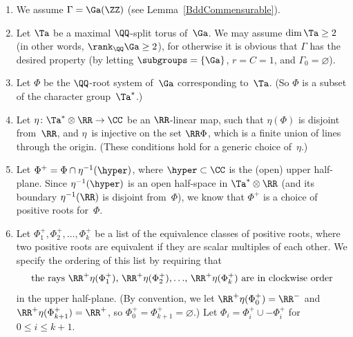\begin{notation} \label{QIBddGenNotation}\leavevmode
	\begin{enumerate}\itemsep=0pt
\item %
	We assume $\Gamma = \Ga(\ZZ)$ (see Lemma~\ref{BddCommensurable}).
\item %
	Let $\Ta$ be a maximal $\QQ$-split torus of~$\Ga$. We may assume $\dim \Ta \ge 2$ (in other words, $\rank_\QQ \Ga \ge 2$), for otherwise it is obvious that $\Gamma$ has the desired property (by letting $\subgroups = \{\Ga\}$, $r = C = 1$, and $\Gamma_0 = \varnothing$).
\item Let $\Phi$ be the $\QQ$-root system of~$\Ga$ corresponding to~$\Ta$.
	(So $\Phi$ is a subset of the character group~$\Ta^*$.)
\item Let $\eta \colon \Ta^* \otimes \RR \to \CC$ be an $\RR$-linear map, such that $\eta(\Phi)$ is disjoint from~$\RR$, and $\eta$~is injective on the set $\RR \Phi$, which is a finite union of lines through the origin. (These conditions hold for a generic choice of~$\eta$.)
\item Let $\Phi^+ = \Phi \cap \eta^{-1}(\hyper)$, where $\hyper \subset \CC$ is the (open) upper half-plane.
Since $\eta^{-1}(\hyper)$ is an open half-space in $\Ta^* \otimes \RR$ (and its boundary $\eta^{-1}(\RR)$ is disjoint from~$\Phi$), we know that $\Phi^+$ is a choice of positive roots for~$\Phi$.
\item Let $\Phi^+_1, \Phi^+_2,\ldots,\Phi^+_k$ be a list of the equivalence classes of positive roots, where two positive roots are equivalent if they are scalar multiples of each other. We specify the ordering of this list by requiring that
		\[ \text{the rays $\RR^+ \eta(\Phi^+_1)$, $\RR^+ \eta(\Phi^+_2), \ldots$, $\RR^+ \eta(\Phi^+_k)$ are in clockwise order} \]
	in the upper half-plane.
	(By convention, we let $\RR^+ \eta(\Phi^+_0) = \RR^-$ and $\RR^+ \eta(\Phi^+_{k+1}) = \RR^+$, so $\Phi^+_0 = \Phi^+_{k+1} = \varnothing$.)
	Let $\Phi_i = \Phi^+_i \cup - \Phi^+_i$ for $0 \le i \le k + 1$.
	

\end{enumerate}
\end{notation}
